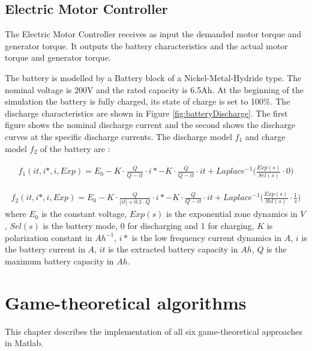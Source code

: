 \subsection{Electric Motor Controller}
The Electric Motor Controller receives as input the demanded motor torque and generator torque. It outputs the battery characteristics and the actual motor torque and generator torque.

The battery is modelled by a Battery block of a Nickel-Metal-Hydride type. The nominal voltage is 200V and the rated capacity is 6.5Ah. At the beginning of the simulation the battery is fully charged, its state of charge is set to 100\%. The discharge characteristics are shown in Figure \ref{fig:batteryDischarge}. The first figure shows the nominal discharge current and the second shows the discharge curves at the specific discharge currents. The discharge model $f_1$ and charge model $f_2$ of the battery are \citep{batteryMatlab}:

\begin{equation}
\begin{split}
f_1(it,i*,i,Exp) = E_0 - K \cdot \frac{Q}{Q-it} \cdot i* - K \cdot \frac{Q}{Q-it} \cdot it + Laplace^{-1} \bigg( \frac{Exp(s)}{Sel(s)} \cdot 0 \bigg)
\end{split}
\end{equation}

\begin{equation}
\begin{split}
f_2(it,i*,i,Exp) = E_0 - K \cdot \frac{Q}{|it|+0.1 \cdot Q} \cdot i* - K \cdot \frac{Q}{Q-it} \cdot it + Laplace^{-1} \bigg( \frac{Exp(s)}{Sel(s)} \cdot \frac{1}{s} \bigg)
\end{split}
\end{equation}
where $E_0$ is the constant voltage, $Exp(s)$ is the exponential zone dynamics in $V$, $Sel(s)$ is the battery mode, 0 for discharging and 1 for charging, $K$ is polarization constant in $Ah^{-1}$, $i*$ is the low frequency current dynamics in $A$, $i$ is the battery current in $A$, $it$ is the extracted battery capacity in $Ah$, $Q$ is the maximum battery capacity in $Ah$.

\section{Game-theoretical algorithms}
This chapter describes the implementation of all six game-theoretical approaches in Matlab.